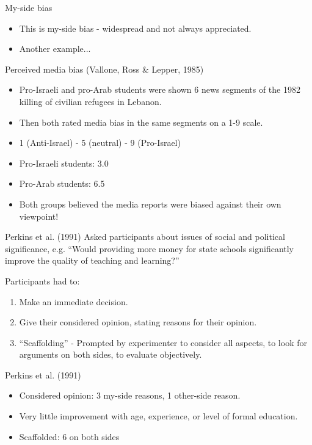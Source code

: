 \documentclass{beamer}
\begin{document}
\begin{frame}{My-side bias}
\begin{itemize}
\item This is my-side bias - widespread and not always appreciated.
\item Another example...
\end{itemize}
\end{frame}

\begin{frame}{Perceived media bias (Vallone, Ross \& Lepper, 1985)}
\begin{itemize}
\item Pro-Israeli and pro-Arab students were shown 6 news segments of the 1982 killing of civilian refugees in Lebanon.
\item Then both rated media bias in the same segments on a 1-9 scale.
\item 1 (Anti-Israel) - 5 (neutral) - 9 (Pro-Israel)
\item Pro-Israeli students:  3.0
\item Pro-Arab students: 6.5
\item Both groups believed the media reports were biased against their own viewpoint!
\end{itemize}
\end{frame}

\begin{frame}{Perkins et al. (1991)}
Asked participants about issues of social and political significance, e.g. ``Would providing more money for state schools significantly improve the quality of teaching and learning?''

Participants had to:
\begin{enumerate}
\item Make an immediate decision.
\item Give their considered opinion, stating reasons for their opinion.
\item ``Scaffolding'' - Prompted by experimenter to consider all aspects, to look for arguments on both sides, to evaluate objectively.
\end{enumerate}
\end{frame}

\begin{frame}{Perkins et al. (1991)}
\begin{itemize}
\item Considered opinion: 3 my-side reasons, 1 other-side reason.
\item Very little improvement with age, experience, or level of formal education.
\item Scaffolded: 6 on both sides
\end{itemize}
\end{frame}
\end{document}
